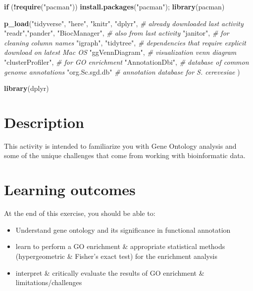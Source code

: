 \documentclass[
]{book}
\newenvironment{Shaded}{\begin{snugshade}}{\end{snugshade}}
\newcommand{\CommentTok}[1]{\textcolor[rgb]{0.56,0.35,0.01}{\textit{#1}}}
\newcommand{\ControlFlowTok}[1]{\textcolor[rgb]{0.13,0.29,0.53}{\textbf{#1}}}
\newcommand{\FunctionTok}[1]{\textcolor[rgb]{0.13,0.29,0.53}{\textbf{#1}}}
\newcommand{\NormalTok}[1]{#1}
\newcommand{\SpecialCharTok}[1]{\textcolor[rgb]{0.81,0.36,0.00}{\textbf{#1}}}
\newcommand{\StringTok}[1]{\textcolor[rgb]{0.31,0.60,0.02}{#1}}
\providecommand{\tightlist}{%
  \setlength{\itemsep}{0pt}\setlength{\parskip}{0pt}}
\begin{document}
\begin{Shaded}
\begin{Highlighting}[]
\ControlFlowTok{if}\NormalTok{ (}\SpecialCharTok{!}\FunctionTok{require}\NormalTok{(}\StringTok{"pacman"}\NormalTok{)) }\FunctionTok{install.packages}\NormalTok{(}\StringTok{"pacman"}\NormalTok{); }\FunctionTok{library}\NormalTok{(pacman)}

\FunctionTok{p\_load}\NormalTok{(}\StringTok{"tidyverse"}\NormalTok{, }\StringTok{"here"}\NormalTok{, }\StringTok{"knitr"}\NormalTok{, }\StringTok{"dplyr"}\NormalTok{, }\CommentTok{\# already downloaded last activity}
       \StringTok{"readr"}\NormalTok{,}\StringTok{"pander"}\NormalTok{, }\StringTok{"BiocManager"}\NormalTok{, }\CommentTok{\# also from last activity}
       \StringTok{"janitor"}\NormalTok{, }\CommentTok{\# for cleaning column names}
       \StringTok{"igraph"}\NormalTok{, }\StringTok{"tidytree"}\NormalTok{, }\CommentTok{\# dependencies that require explicit download on latest Mac OS}
       \StringTok{"ggVennDiagram"}\NormalTok{, }\CommentTok{\# visualization venn diagram}
       \StringTok{"clusterProfiler"}\NormalTok{, }\CommentTok{\# for GO enrichment}
       \StringTok{"AnnotationDbi"}\NormalTok{, }\CommentTok{\# database of common genome annotations}
       \StringTok{"org.Sc.sgd.db"} \CommentTok{\# annotation database for S. cerevesiae}
\NormalTok{       )}

\FunctionTok{library}\NormalTok{(dplyr)}
\end{Highlighting}
\end{Shaded}

\hypertarget{description}{%
\section{Description}\label{description}}

This activity is intended to familiarize you with Gene Ontology analysis and some of the unique challenges that come from working with bioinformatic data.

\hypertarget{learning-outcomes-1}{%
\section{Learning outcomes}\label{learning-outcomes-1}}

At the end of this exercise, you should be able to:

\begin{itemize}
\tightlist
\item
  Understand gene ontology and its significance in functional annotation
\item
  learn to perform a GO enrichment \& appropriate statistical methods (hypergeometric \& Fisher's exact test) for the enrichment analysis
\item
  interpret \& critically evaluate the results of GO enrichment \& limitations/challenges
\end{itemize}
\end{document}
